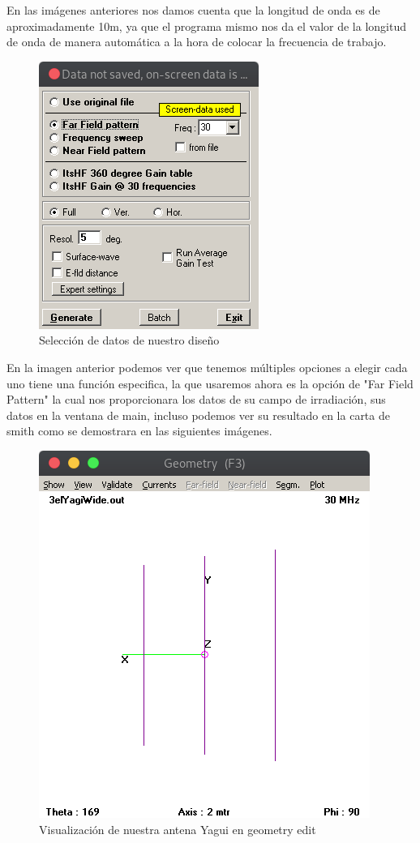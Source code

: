 \documentclass[11pt,a4paper]{article}
\begin{document}
En las imágenes anteriores nos damos cuenta que la longitud de onda es de aproximadamente 10m, ya que el programa mismo nos da el valor de la longitud de onda de manera automática a la hora de colocar la frecuencia de trabajo.

\begin{figure}[H]
    \centering
    \includegraphics[scale=0.50]{images/Ejemplos/datos.png}
    \caption{Selección de datos de nuestro diseño}
    \label{fig3:yagui2d}
\end{figure}

En la imagen anterior podemos ver que tenemos múltiples opciones a elegir cada uno tiene una función especifica, la que usaremos ahora es la opción de "Far Field Pattern" la cual nos proporcionara los datos de su campo de irradiación, sus datos en la ventana de main, incluso podemos ver su resultado en la carta de smith como se demostrara en las siguientes imágenes.

\begin{figure}[H]
    \centering
    \includegraphics[scale=0.5]{images/Ejemplos/geo.png}
    \caption{Visualización de nuestra antena Yagui en geometry edit}
    \label{fig3:yagui2d}
\end{figure}
\end{document}
